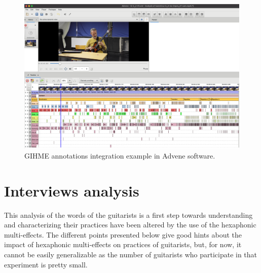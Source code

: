 \documentclass{article}
\begin{document}
\begin{figure}
    \centering
    \includegraphics[width=\columnwidth]{figures/IvannCruz_2_3_1_Advene.png}
    \caption{GIHME annotations integration example in Advene software.}
    \label{fig:Ivann-2_4-advene}
\end{figure}


    
    


\section{Interviews analysis}
\label{sec:analysis}

This analysis of the words of the guitarists is a first step towards understanding and characterizing their practices have been altered by the use of the hexaphonic multi-effects.  
The different points presented below give good hints about the impact of hexaphonic multi-effects on practices of guitarists, but, for now, it cannot be easily generalizable as the number of guitarists who participate in that experiment is pretty small.
\end{document}
